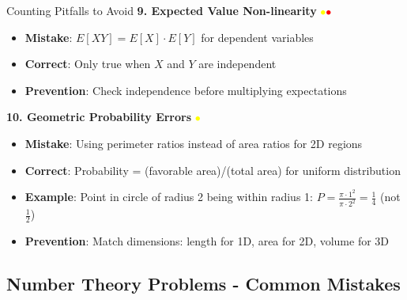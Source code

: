 \documentclass{article}
\begin{document}
\begin{trapbox}{Counting Pitfalls to Avoid}
\textbf{9. Expected Value Non-linearity} \textcolor{yellow}{$\bullet$}\textcolor{red}{$\bullet$}
\begin{itemize}[nosep]
\item \textbf{Mistake}: $E[XY] = E[X] \cdot E[Y]$ for dependent variables
\item \textbf{Correct}: Only true when $X$ and $Y$ are independent
\item \textbf{Prevention}: Check independence before multiplying expectations
\end{itemize}

\textbf{10. Geometric Probability Errors} \textcolor{yellow}{$\bullet$}
\begin{itemize}[nosep]
\item \textbf{Mistake}: Using perimeter ratios instead of area ratios for 2D regions
\item \textbf{Correct}: Probability = (favorable area)/(total area) for uniform distribution
\item \textbf{Example}: Point in circle of radius 2 being within radius 1: $P = \frac{\pi \cdot 1^2}{\pi \cdot 2^2} = \frac{1}{4}$ (not $\frac{1}{2}$)
\item \textbf{Prevention}: Match dimensions: length for 1D, area for 2D, volume for 3D
\end{itemize}
\end{trapbox}

\subsection{Number Theory Problems - Common Mistakes}
\end{document}
